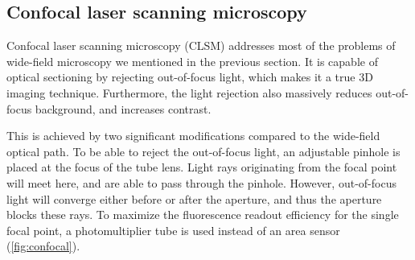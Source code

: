   \subsection{Confocal laser scanning microscopy}

    Confocal laser scanning microscopy (CLSM) \cite{minsky_microscopy_1961,davidovits_scanning_1969} addresses most of the problems of wide-field microscopy we mentioned in the previous section. It is capable of optical sectioning by rejecting out-of-focus light, which makes it a
    true %
    3D imaging technique. Furthermore, the light rejection also massively reduces out-of-focus background, and increases contrast.

    This is achieved by two significant modifications compared to the wide-field optical path. To be able to reject the out-of-focus light, an adjustable pinhole is placed at the focus of the tube lens. Light rays originating from the focal point will meet here, and are able to pass through the pinhole. However, out-of-focus light will converge either before or after the aperture, and thus the aperture blocks these rays. To maximize the fluorescence readout efficiency for the single focal point, a photomultiplier tube is used instead of an area sensor (\autoref{fig:confocal}).

